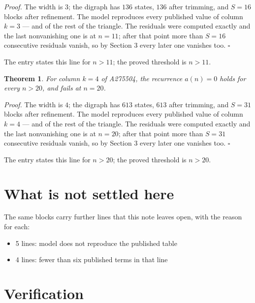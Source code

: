\documentclass[11pt]{article}
\newtheorem{theorem}{Theorem}
\theoremstyle{definition}
\begin{document}
{\itshape Proof.} The width is $3$; the digraph has $136$ states, $136$ after trimming, and $S = 16$ blocks after refinement. The model reproduces every published value of column $k = 3$ --- and of the rest of the triangle. The residuals were computed exactly and the last nonvanishing one is at $n = 11$; after that point more than $S = 16$ consecutive residuals vanish, so by Section 3 every later one vanishes too. $\square$

The entry states this line for $n > 11$; the proved threshold is $n > 11$.

\begin{theorem} For column $k = 4$ of A275504, the recurrence $a(n) = 0$ holds for every $n > 20$, and fails at $n = 20$.\end{theorem}

{\itshape Proof.} The width is $4$; the digraph has $613$ states, $613$ after trimming, and $S = 31$ blocks after refinement. The model reproduces every published value of column $k = 4$ --- and of the rest of the triangle. The residuals were computed exactly and the last nonvanishing one is at $n = 20$; after that point more than $S = 31$ consecutive residuals vanish, so by Section 3 every later one vanishes too. $\square$

The entry states this line for $n > 20$; the proved threshold is $n > 20$.

\section{What is not settled here}

The same blocks carry further lines that this note leaves open, with the reason for each:

\begin{itemize}

\item 5 lines: model does not reproduce the published table

\item 4 lines: fewer than six published terms in that line

\end{itemize}

\section{Verification}
\end{document}
